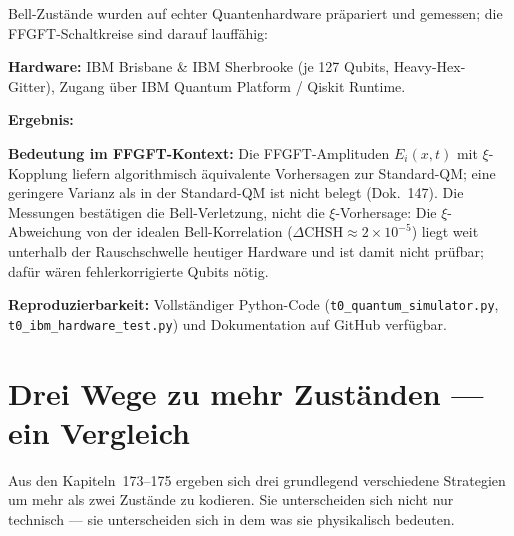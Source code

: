 \begin{keyresult}
Bell-Zustände wurden auf echter Quantenhardware präpariert
und gemessen; die FFGFT-Schaltkreise sind darauf lauffähig:

\textbf{Hardware:} IBM Brisbane \& IBM Sherbrooke (je 127 Qubits,
Heavy-Hex-Gitter), Zugang über IBM Quantum Platform / Qiskit Runtime.

\textbf{Ergebnis:}
\begin{center}
\end{center}

\textbf{Bedeutung im FFGFT-Kontext:}
Die FFGFT-Amplituden $E_i(x,t)$ mit $\xi$-Kopplung liefern
algorithmisch äquivalente Vorhersagen zur Standard-QM;
eine geringere Varianz als in der Standard-QM ist nicht belegt (Dok.~147).
Die Messungen bestätigen die Bell-Verletzung, nicht die $\xi$-Vorhersage:
Die $\xi$-Abweichung von der idealen Bell-Korrelation
($\Delta\text{CHSH} \approx 2\times10^{-5}$) liegt weit unterhalb
der Rauschschwelle heutiger Hardware und ist damit nicht prüfbar;
dafür wären fehlerkorrigierte Qubits nötig.

\textbf{Reproduzierbarkeit:} Vollständiger Python-Code
(\texttt{t0\_quantum\_simulator.py}, \texttt{t0\_ibm\_hardware\_test.py})
und Dokumentation auf GitHub verfügbar.
\end{keyresult}

\section{Drei Wege zu mehr Zuständen --- ein Vergleich}
\label{sec:drei-wege}

Aus den Kapiteln~173--175 ergeben sich drei
grundlegend verschiedene Strategien um mehr
als zwei Zustände zu kodieren.
Sie unterscheiden sich nicht nur technisch ---
sie unterscheiden sich in dem was sie
physikalisch bedeuten.

